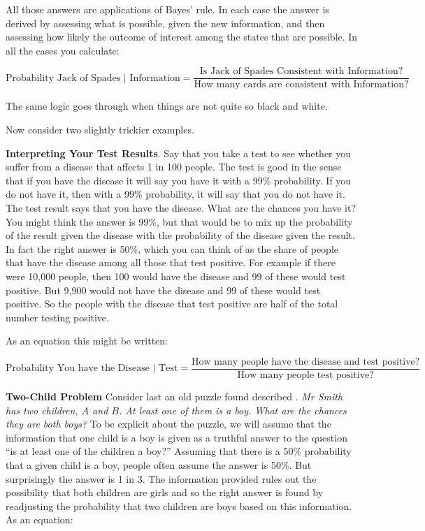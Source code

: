 \documentclass[12pt,]{book}
\begin{document}
All those answers are applications of Bayes' rule. In each case the answer is derived by assessing what is possible, given the new information, and then assessing how likely the outcome of interest among the states that are possible. In all the cases you calculate:

\[\text{Probability Jack of Spades | Information} = \frac{\text{Is Jack of Spades Consistent with Information?}}{\text{How many cards are consistent with Information?}} \]

The same logic goes through when things are not quite so black and white.

Now consider two slightly trickier examples.

\textbf{Interpreting Your Test Results}. Say that you take a test to see whether you suffer from a disease that affects 1 in 100 people. The test is good in the sense that if you have the disease it will say you have it with a 99\% probability. If you do not have it, then with a 99\% probability, it will say that you do not have it. The test result says that you have the disease. What are the chances you have it? You might think the answer is 99\%, but that would be to mix up the probability of the result given the disease with the probability of the disease given the result. In fact the right answer is 50\%, which you can think of as the share of people that have the disease among all those that test positive. For example if there were 10,000 people, then 100 would have the disease and 99 of these would test positive. But 9,900 would not have the disease and 99 of these would test positive. So the people with the disease that test positive are half of the total number testing positive.

As an equation this might be written:

\[\text{Probability You have the Disease | Test} = \frac{\text{How many people have the disease and test positive?}}{\text{How many people test positive?}} \]

\textbf{Two-Child Problem} Consider last an old puzzle found described \citet{gardner1961second}. \emph{Mr Smith has two children, \(A\) and \(B\). At least one of them is a boy. What are the chances they are both boys?}
To be explicit about the puzzle, we will assume that the information that one child is a boy is given as a truthful answer to the question ``is at least one of the children a boy?'' Assuming that there is a 50\% probability that a given child is a boy, people often assume the answer is 50\%. But surprisingly the answer is 1 in 3. The information provided rules out the possibility that both children are girls and so the right answer is found by readjusting the probability that two children are boys based on this information. As an equation:
\end{document}
